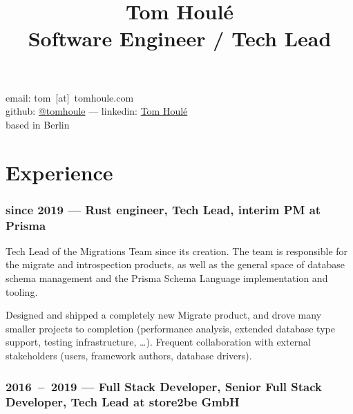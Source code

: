 \documentclass[10pt]{article}
\date{}
\title{Tom Houlé \\ Software Engineer / Tech Lead}
\author{}
\newcommand{\setparskip}{\setlength{\parskip}{.3em}}
\begin{document}
\maketitle

\vspace{-12mm}
\begin{center}
email: tom~[at]~tomhoule.com \\
github: \href{https://github.com/tomhoule}{@tomhoule}  --- linkedin: \href{https://www.linkedin.com/in/tom-houl\%C3\%A9-4398135a/}{Tom Houlé} \\
based in Berlin
\end{center}

\vspace{8mm}

\begin{minipage}[t]{0.54\textwidth}
  \setparskip

  \section*{Experience}

  \vspace{-0.5em}

  \subsubsection*{since 2019 --- Rust engineer, Tech Lead, interim PM at Prisma}

    \vspace{-0.8em}

    Tech Lead of the Migrations Team since its creation. The team is responsible
    for the migrate and introspection products, as well as the general space of
    database schema management and the Prisma Schema Language implementation and
    tooling.

    Designed and shipped a completely new Migrate product, and drove many smaller projects to completion (performance analysis, extended database type support, testing infrastructure, …). Frequent collaboration with external stakeholders (users, framework authors, database drivers).

    \vspace{-0.5em}

    \subsubsection*{2016~--~2019 --- Full Stack Developer, Senior Full Stack Developer, Tech Lead at store2be GmbH}


\end{minipage}
\end{document}
